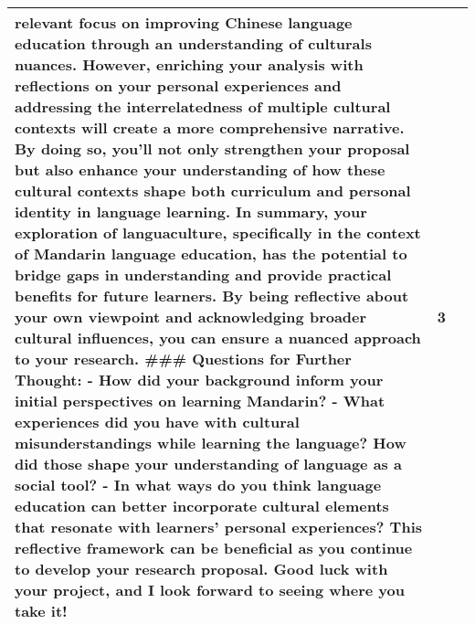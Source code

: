 \begin{longtable}{|p{}|p{}|p{}|}
relevant focus on improving Chinese language education through an understanding of culturals nuances. However, enriching your analysis with reflections on your personal experiences and addressing the interrelatedness of multiple cultural contexts will create a more comprehensive narrative. By doing so, you'll not only strengthen your proposal but also enhance your understanding of how these cultural contexts shape both curriculum and personal identity in language learning.  In summary, your exploration of languaculture, specifically in the context of Mandarin language education, has the potential to bridge gaps in understanding and provide practical benefits for future learners. By being reflective about your own viewpoint and acknowledging broader cultural influences, you can ensure a nuanced approach to your research.  \#\#\# Questions for Further Thought: - How did your background inform your initial perspectives on learning Mandarin? - What experiences did you have with cultural misunderstandings while learning the language? How did those shape your understanding of language as a social tool? - In what ways do you think language education can better incorporate cultural elements that resonate with learners' personal experiences?  This reflective framework can be beneficial as you continue to develop your research proposal. Good luck with your project, and I look forward to seeing where you take it! & 3 \\
\hline

\end{longtable}
